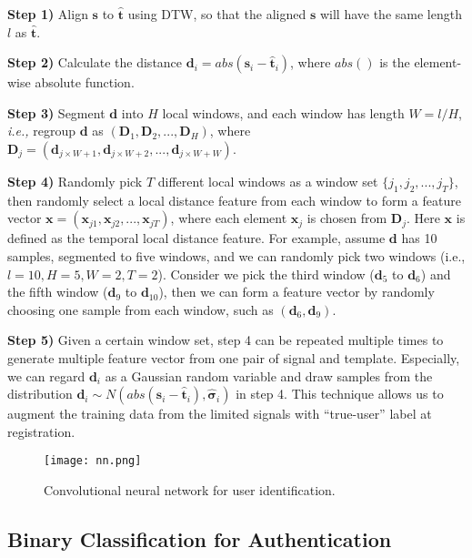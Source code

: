\documentclass[conference]{IEEEtran}
\begin{document}
\textbf{Step 1)} Align $\mathbf{s}$ to $\hat{\mathbf{t}}$ using DTW, so that the aligned $\mathbf{s}$ will have the same length $l$ as $\hat{\mathbf{t}}$. 

\textbf{Step 2)} Calculate the distance $\mathbf{d}_i = abs(\mathbf{s}_i - \hat{\mathbf{t}}_i)$, where $abs()$ is the element-wise absolute function.

\textbf{Step 3)} Segment $\mathbf{d}$ into $H$ local windows, and each window has length $W = l / H$, \textit{i.e.,} regroup $\mathbf{d}$ as $(\mathbf{D}_1, \mathbf{D}_2, ..., \mathbf{D}_H)$, where $\mathbf{D}_j = (\mathbf{d}_{j \times W + 1}, \mathbf{d}_{j \times W + 2}, ..., \mathbf{d}_{j \times W + W})$. 

\textbf{Step 4)} Randomly pick $T$ different local windows as a window set $\{j_1, j_2, ..., j_T\}$, then randomly select a local distance feature from each window to form a feature vector $\mathbf{x} = (\mathbf{x}_{j1}, \mathbf{x}_{j2}, ..., \mathbf{x}_{jT})$, where each element $\mathbf{x}_j$ is chosen from $\mathbf{D}_j$. Here $\mathbf{x}$ is defined as the temporal local distance feature. For example, assume $\mathbf{d}$ has 10 samples, segmented to five windows, and we can randomly pick two windows (i.e., $l = 10, H = 5, W = 2, T = 2$). Consider we pick the third window ($\mathbf{d}_{5}$ to $\mathbf{d}_{6}$) and the fifth window ($\mathbf{d}_{9}$ to $\mathbf{d}_{10}$), then we can form a feature vector by randomly choosing one sample from each window, such as $(\mathbf{d}_{6}, \mathbf{d}_{9})$.

\textbf{Step 5)} Given a certain window set, step 4 can be repeated multiple times to generate multiple feature vector from one pair of signal and template. Especially, we can regard $\mathbf{d}_i$ as a Gaussian random variable and draw samples from the distribution $\mathbf{d}_i \sim N(abs(\mathbf{s}_i - \hat{\mathbf{t}}_i), \hat{\boldsymbol{\sigma}}_i)$ in step 4. This technique allows us to augment the training data from the limited signals with ``true-user'' label at registration.


\begin{figure*}[]
\centering
\texttt{[image: nn.png]}
\caption{Convolutional neural network for user identification.}
\label{fig:nn}
\end{figure*}


\subsection{Binary Classification for Authentication}
\end{document}
